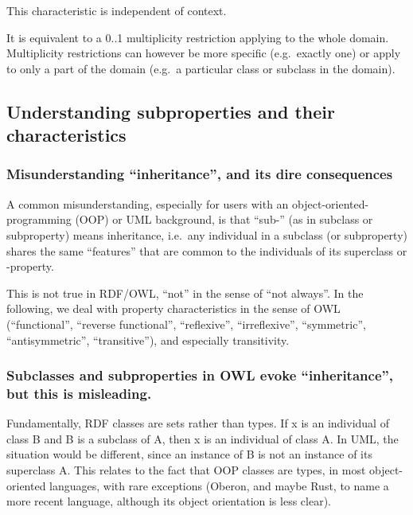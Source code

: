 \documentclass[
  11pt,
]{article}
\begin{document}
This characteristic is independent of context.

It is equivalent to a 0..1 multiplicity restriction applying to the
whole domain. Multiplicity restrictions can however be more specific
(e.g.~exactly one) or apply to only a part of the domain (e.g.~a
particular class or subclass in the domain).

\hypertarget{understanding-subproperties-and-their-characteristics}{%
\subsection{Understanding subproperties and their
characteristics}\label{understanding-subproperties-and-their-characteristics}}

\hypertarget{misunderstanding-inheritance-and-its-dire-consequences}{%
\subsubsection{Misunderstanding ``inheritance'', and its dire
consequences}\label{misunderstanding-inheritance-and-its-dire-consequences}}

A common misunderstanding, especially for users with an
object-oriented-programming (OOP) or UML background, is that ``sub-''
(as in subclass or subproperty) means inheritance, i.e.~any individual
in a subclass (or subproperty) shares the same ``features'' that are
common to the individuals of its superclass or -property.

This is not true in RDF/OWL, ``not'' in the sense of ``not always''. In
the following, we deal with property characteristics in the sense of OWL
(``functional'', ``reverse functional'', ``reflexive'', ``irreflexive'',
``symmetric'', ``antisymmetric'', ``transitive''), and especially
transitivity.

\hypertarget{subclasses-and-subproperties-in-owl-evoke-inheritance-but-this-is-misleading.}{%
\subsubsection{Subclasses and subproperties in OWL evoke
``inheritance'', but this is
misleading.}\label{subclasses-and-subproperties-in-owl-evoke-inheritance-but-this-is-misleading.}}

Fundamentally, RDF classes are sets rather than types. If x is an
individual of class B and B is a subclass of A, then x is an individual
of class A. In UML, the situation would be different, since an instance
of B is not an instance of its superclass A. This relates to the fact
that OOP classes are types, in most object-oriented languages, with rare
exceptions (Oberon, and maybe Rust, to name a more recent language,
although its object orientation is less clear).
\end{document}
